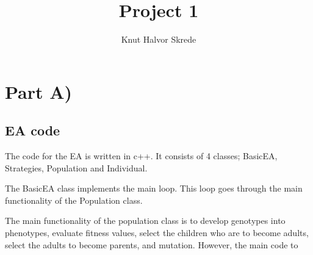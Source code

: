 \documentclass[11pt]{article}
\title{Project 1}
\author{Knut Halvor Skrede}
\begin{document}
\maketitle
\clearpage

\section*{Part A)}

\subsection*{EA code}

The code for the EA is written in c++. It consists of 4 classes; 
BasicEA, Strategies, Population and Individual.

The BasicEA class implements the main loop. This loop goes through
the main functionality of the Population class.

The main functionality of the population class is to develop genotypes
into phenotypes, evaluate fitness values, select the children who are to
become adults, select the adults to become parents, and mutation. However,
the main code to
\end{document}
